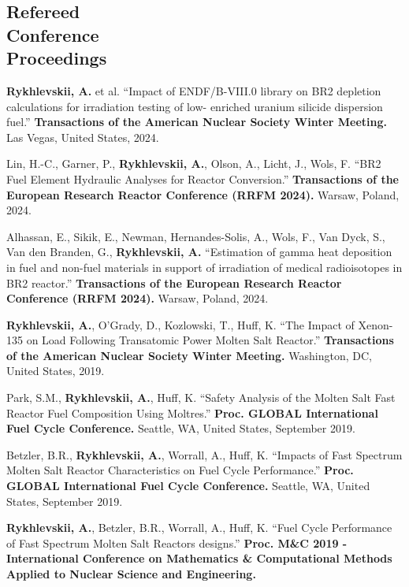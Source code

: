 \documentclass[margin,line]{resume}
\begin{document}
\begin{resume}
    \section{\mysidestyle Refereed\\Conference\\Proceedings}
    \begin{bibenum}
     \item \textbf{Rykhlevskii, A.} et al. 
     ``Impact of ENDF/B-VIII.0 library on BR2 depletion calculations for irradiation testing of low-    	enriched uranium silicide dispersion fuel.'' \textbf{Transactions of the American Nuclear Society Winter 
     Meeting.} Las Vegas, United States, 2024.
     \item Lin, H.-C., Garner, P., \textbf{Rykhlevskii, A.}, Olson, A., Licht, J., Wols, F. 
     ``BR2 Fuel Element Hydraulic Analyses for Reactor Conversion.'' \textbf{Transactions of the European Research Reactor Conference (RRFM 2024).} Warsaw, Poland, 2024.
     \item Alhassan, E., Sikik, E., Newman, Hernandes-Solis, A., Wols, F., Van Dyck, S., Van den Branden, G., \textbf{Rykhlevskii, A.} 
     ``Estimation of gamma heat deposition in fuel and non-fuel materials in support of irradiation of medical radioisotopes in BR2 reactor.'' \textbf{Transactions of the European Research Reactor Conference (RRFM 2024).} Warsaw, Poland, 2024.
     \item \textbf{Rykhlevskii, A.}, O'Grady, D., Kozlowski, T., Huff, K. 
     ``The Impact of Xenon-135 on Load Following Transatomic Power Molten Salt 
     Reactor.'' \textbf{Transactions of the American Nuclear Society Winter 
     Meeting.} Washington, DC, United States, 2019.
     \item Park, S.M., \textbf{Rykhlevskii, A.}, Huff, K. 
	``Safety Analysis of the Molten Salt Fast Reactor Fuel Composition Using 
	Moltres.'' \textbf{Proc. GLOBAL International Fuel Cycle Conference.} Seattle, WA, United States, September 2019.    
     \item Betzler, B.R., \textbf{Rykhlevskii, A.}, Worrall, A., Huff, K. 
     ``Impacts of Fast Spectrum Molten Salt Reactor Characteristics on Fuel 
     Cycle Performance.'' \textbf{Proc. GLOBAL International Fuel Cycle 
     Conference.} Seattle, WA, United States, September 2019.    
    \item \textbf{Rykhlevskii, A.}, Betzler, B.R., Worrall, A., Huff, K. ``Fuel Cycle Performance of Fast Spectrum Molten Salt Reactors designs.'' \textbf{Proc. M\&C 2019 - International Conference on Mathematics \& Computational Methods Applied to Nuclear Science and Engineering.} 

\end{bibenum}
\end{resume}
\end{document}
